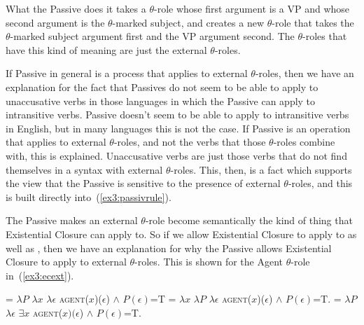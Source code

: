 What the Passive does it takes a $\theta$-role whose first argument is a VP and whose second argument is the $\theta$-marked subject, and creates a new $\theta$-role that takes the $\theta$-marked subject argument first and the VP argument second. The $\theta$-roles that have this kind of meaning are just the external $\theta$-roles.

If Passive in general is a process that applies to external $\theta$-roles, then we have an explanation for the fact that Passives do not seem to be able to apply to unaccusative verbs in those languages in which the Passive can apply to intransitive verbs. Passive doesn't seem to be able to apply to intransitive verbs in English, but in many languages this is not the case. If Passive is an operation that applies to external $\theta$-roles, and not the verbs that those $\theta$-roles combine with, this is explained. Unaccusative verbs are just those verbs that do not find themselves in a syntax with external $\theta$-roles. This, then, is a fact which supports the view that the Passive is sensitive to the presence of external $\theta$-roles, and this is built directly into~(\ref{ex3:passivrule}).

The Passive makes an external $\theta$-role become semantically the kind of thing that Existential Closure can apply to. So if we allow Existential Closure to apply to  as well as , then we have an explanation for why the Passive allows Existential Closure to apply to external $\theta$-roles. This is shown for the Agent $\theta$-role in~(\ref{ex3:ecext}).

\begin{fullwidth}
\begin{exe}
	\raggedright
	\ex \label{ex3:ecext} 
	\begin{xlist}
		\ex 
		 = $\lambda P$ $\lambda x$ $\lambda \epsilon$ \textsc{agent}($x$)($\epsilon$) $\wedge$ $P(\epsilon)$=T 
		\ex 
		 = $\lambda x$ $\lambda P$ $\lambda \epsilon$ \textsc{agent}($x$)($\epsilon$) $\wedge$ $P(\epsilon)$=T.
		\ex 
		 = $\lambda P$ $\lambda \epsilon$ $\exists x$ \textsc{agent}($x)(\epsilon$) $\wedge$ $P(\epsilon)$=T.
	\end{xlist}
\end{exe}
\end{fullwidth}

